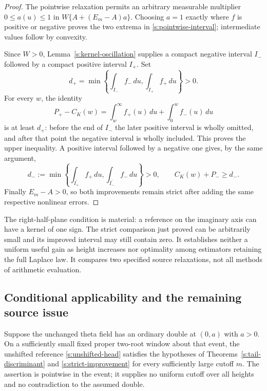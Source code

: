 \begin{proof}
The pointwise relaxation permits an arbitrary measurable multiplier
$0\le a(u)\le1$ in $W\{A+(E_m-A)a\}$.  Choosing $a=1$ exactly
where $f$ is positive or negative proves the two extrema in
\eqref{s:pointwise-interval}; intermediate values follow by convexity.

Since $W>0$, Lemma~\ref{s:kernel-oscillation} supplies a compact
negative interval $I_-$ followed by a compact positive interval $I_+$.
Set
\[
 d_+=\min\left\{\int_{I_-}f_-\,du,
                         \int_{I_+}f_+\,du\right\}>0.
\]
For every $w$, the identity
\[
 P_+-C_K(w)=\int_w^\infty f_+(u)\,du
                              +\int_0^w f_-(u)\,du
\]
is at least $d_+$: before the end of $I_-$ the later positive interval
is wholly omitted, and after that point the negative interval is
wholly included.  This proves the upper inequality.  A positive
interval followed by a negative one gives, by the same argument,
\[
 d_-:=\min\left\{\int_{I_+^{\prime}}f_+\,du,
                         \int_{I_-^{\prime}}f_-\,du\right\}>0,
 \qquad C_K(w)+P_-\ge d_-.
\]
Finally $E_m-A>0$, so both improvements remain strict after adding
the same respective nonlinear errors.
\end{proof}

The right-half-plane condition is material: a reference on the
imaginary axis can have a kernel of one sign.  The strict comparison
just proved can be arbitrarily small and its improved interval may
still contain zero.  It establishes neither a uniform useful gain as
height increases nor optimality among estimators retaining the full
Laplace law.  It compares two specified source relaxations, not all
methods of arithmetic evaluation.

\subsection{Conditional applicability and the remaining source issue}

\begin{proposition}
\label{s:tail-local-applicability}
Suppose the unchanged theta field has an ordinary double at $(0,a)$
with $a>0$.  On a sufficiently small fixed proper two-root window about
that event, the unshifted reference \eqref{s:unshifted-head} satisfies
the hypotheses of Theorems~\ref{s:tail-discriminant} and
\ref{s:strict-improvement} for every sufficiently large cutoff $m$.
The assertion is pointwise in the event; it supplies no uniform cutoff
over all heights and no contradiction to the assumed double.
\end{proposition}

